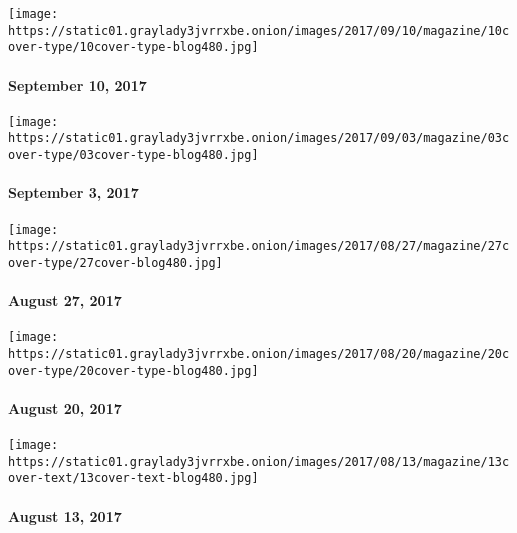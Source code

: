 \href{https://www.nytimes3xbfgragh.onion/issue/magazine/2017/09/08/91017-issue}{}

\texttt{[image: https://static01.graylady3jvrrxbe.onion/images/2017/09/10/magazine/10cover-type/10cover-type-blog480.jpg]}

\hypertarget{september-10-2017}{%
\paragraph{September 10, 2017}\label{september-10-2017}}

\href{https://www.nytimes3xbfgragh.onion/issue/magazine/2017/09/01/90317-issue}{}

\texttt{[image: https://static01.graylady3jvrrxbe.onion/images/2017/09/03/magazine/03cover-type/03cover-type-blog480.jpg]}

\hypertarget{september-3-2017}{%
\paragraph{September 3, 2017}\label{september-3-2017}}

\href{https://www.nytimes3xbfgragh.onion/issue/magazine/2017/08/25/the-82717-issue}{}

\texttt{[image: https://static01.graylady3jvrrxbe.onion/images/2017/08/27/magazine/27cover-type/27cover-blog480.jpg]}

\hypertarget{august-27-2017}{%
\paragraph{August 27, 2017}\label{august-27-2017}}

\href{https://www.nytimes3xbfgragh.onion/issue/magazine/2017/08/18/82017-issue}{}

\texttt{[image: https://static01.graylady3jvrrxbe.onion/images/2017/08/20/magazine/20cover-type/20cover-type-blog480.jpg]}

\hypertarget{august-20-2017}{%
\paragraph{August 20, 2017}\label{august-20-2017}}

\href{https://www.nytimes3xbfgragh.onion/issue/magazine/2017/08/10/the-81317-issue}{}

\texttt{[image: https://static01.graylady3jvrrxbe.onion/images/2017/08/13/magazine/13cover-text/13cover-text-blog480.jpg]}

\hypertarget{august-13-2017}{%
\paragraph{August 13, 2017}\label{august-13-2017}}

